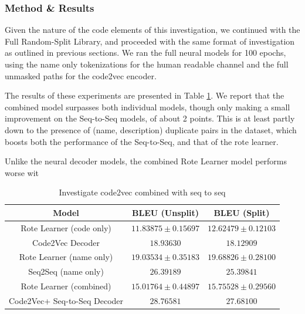\subsubsection{Method \& Results} %

Given the nature of the code elements of this investigation, we continued with the Full Random-Split Library, and proceeded with the same format of investigation as outlined in previous sections. 
We ran the full neural models for 100 epochs, using the name only tokenizations for the human readable channel and the full unmasked paths for the code2vec encoder.

The results of these experiments are presented in Table \ref{table:code2vec_embed}. 
We report that the combined model surpasses both individual models, though only making a small improvement on the Seq-to-Seq models, of about 2 points. 
This is at least partly down to the presence of (name, description) duplicate pairs in the dataset, which boosts both the performance of the Seq-to-Seq, and that of the rote learner.

Unlike the neural decoder models, the combined Rote Learner model performs worse wit 


\begin{table}[h!]
\begin{center}
\begin{tabular}{ c | c | c  }
    Model                             & BLEU (Unsplit)  & BLEU (Split)     \\
    \hline
    Rote Learner  (code only)        & $ 11.83875 \pm  0.15697 $ & $ 12.62479 \pm 0.12103 $ \\
    Code2Vec Decoder                 & $ 18.93630 $ & $ 18.12909 $ \\
    \hline
    \hline
    Rote Learner  (name only)         & $ 19.03534 \pm  0.35183 $ & $ 19.68826 \pm 0.28100 $ \\
    Seq2Seq (name only)               & $ 26.39189 $ & $ 25.39841 $ \\
    \hline
    \hline
    Rote Learner (combined)            & $ 15.01764 \pm  0.44897 $ & $ 15.75528 \pm 0.29560 $ \\
    Code2Vec+ Seq-to-Seq Decoder       & $ 28.76581 $ & $ 27.68100 $ \\
    \hline
\end{tabular}
\caption {Investigate code2vec combined with seq to seq}
\label{table:code2vec_embed}
\end{center}
\end{table}

